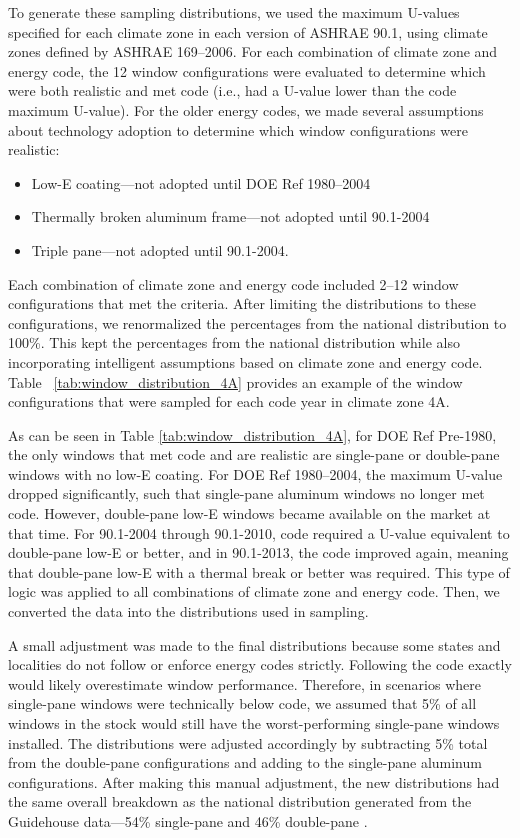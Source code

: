 To generate these sampling distributions, we used the maximum U-values specified for each climate zone in each version of ASHRAE 90.1, using climate zones defined by ASHRAE 169--2006. For each combination of climate zone and energy code, the 12 window configurations were evaluated to determine which were both realistic and met code (i.e., had a U-value lower than the code maximum U-value). For the older energy codes, we made several assumptions about technology adoption to determine which window configurations were realistic:
\begin{itemize}
    \item Low-E coating---not adopted until DOE Ref 1980--2004
    \item Thermally broken aluminum frame---not adopted until 90.1-2004
    \item Triple pane---not adopted until 90.1-2004.
\end{itemize}

Each combination of climate zone and energy code included 2--12 window configurations that met the criteria. After limiting the distributions to these configurations, we renormalized the percentages from the national distribution to 100\%. This kept the percentages from the national distribution while also incorporating intelligent assumptions based on climate zone and energy code. Table ~\ref{tab:window_distribution_4A} provides an example of the window configurations that were sampled for each code year in climate zone 4A.



As can be seen in Table \ref{tab:window_distribution_4A}, for DOE Ref Pre-1980, the only windows that met code and are realistic are single-pane or double-pane windows with no low-E coating. For DOE Ref 1980--2004, the maximum U-value dropped significantly, such that single-pane aluminum windows no longer met code. However, double-pane low-E windows became available on the market at that time. For 90.1-2004 through 90.1-2010, code required a U-value equivalent to double-pane low-E or better, and in 90.1-2013, the code improved again, meaning that double-pane low-E with a thermal break or better was required. This type of logic was applied to all combinations of climate zone and energy code. Then, we converted the data into the distributions used in sampling.

A small adjustment was made to the final distributions because some states and localities do not follow or enforce energy codes strictly. Following the code exactly would likely overestimate window performance. Therefore, in scenarios where single-pane windows were technically below code, we assumed that 5\% of all windows in the stock would still have the worst-performing single-pane windows installed. The distributions were adjusted accordingly by subtracting 5\% total from the double-pane configurations and adding to the single-pane aluminum configurations. After making this manual adjustment, the new distributions had the same overall breakdown as the national distribution generated from the Guidehouse data---54\% single-pane and 46\% double-pane .

